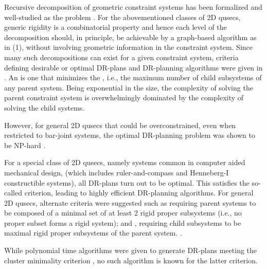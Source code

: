 \medskip\noindent
{}
Recursive decomposition of geometric constraint systems has been formalized \cite{hoffman2001decompositionI,hoffman2001decompositionII} and well-studied \cite{jermann2006decomposition,sitharam2005combinatorial} as the  problem \seedefsprelim. For the abovementioned classes of 2D qusecs, generic rigidity is a combinatorial property and hence each level of the decomposition should, in principle, be achievable by a graph-based algorithm as in (1), without involving geometric information in the constraint system. Since many such decompositions can exist for a given constraint system, criteria defining desirable or optimal DR-plans and DR-planning algorithms were given in \cite{hoffman2001decompositionI}. An  is one that minimizes the  \seedefsprelim, i.e., the maximum number of child subsystems of any parent system. Being exponential in the size, the complexity of solving the parent constraint system is overwhelmingly dominated by the complexity of solving the child systems.

However, for general 2D qusecs that could be overconstrained, even when restricted to bar-joint systems, the optimal DR-planning problem was shown to be NP-hard \cite{lomonosov2004graph}.

\medskip\noindent
{}
For a special class of 2D qusecs, namely  systems  \cite{fudos1997graph,owen1991algebraic,joan-arinyo2004revisiting}  common in computer aided mechanical design, (which includes ruler-and-compass and Henneberg-I constructible systems), all DR-plans turn out to be optimal. This satisfies the so-called  criterion, leading to highly efficient DR-planning algorithms. For general 2D qusecs, alternate criteria were suggested such as  requiring parent systems to be composed of a minimal set of at least 2 rigid proper subsystems (i.e., no proper subset forms a rigid system); and , requiring child subsystems to be maximal rigid proper subsystems of the parent system. \seedefsc.

While polynomial time algorithms were given to generate DR-plans meeting the cluster minimality criterion \cite{hoffman2001decompositionI}, no such algorithm is known for the latter criterion.


